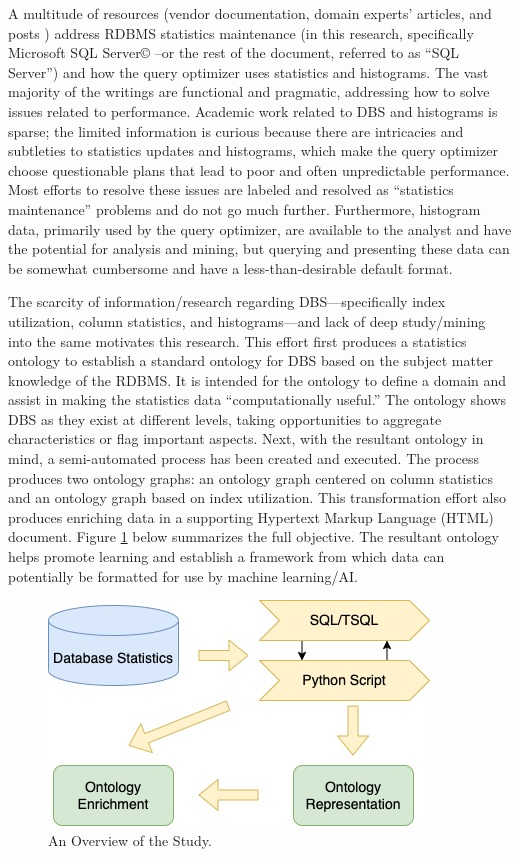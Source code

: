 \documentclass[sigconf]{acmart}
\begin{document}
A multitude of resources (vendor documentation, domain experts' articles, and posts \cite{RWesta, RWestb, RWestc}) address RDBMS statistics maintenance (in this research, specifically Microsoft SQL Server© --or the rest of the document, referred to as “SQL Server”) and how the query optimizer uses statistics and histograms. The vast majority of the writings are functional and pragmatic, addressing how to solve issues related to performance. Academic work related to DBS and histograms is sparse; the limited information is curious because there are intricacies and subtleties to statistics updates and histograms, which make the query optimizer choose questionable plans that lead to poor and often unpredictable performance. Most efforts to resolve these issues are labeled and resolved as “statistics maintenance” problems and do not go much further. Furthermore, histogram data, primarily used by the query optimizer, are available to the analyst and have the potential for analysis and mining, but querying and presenting these data can be somewhat cumbersome and have a less-than-desirable default format.

The scarcity of information/research regarding DBS—specifically index utilization, column statistics, and histograms—and lack of deep study/mining into the same motivates this research. This effort first produces a statistics ontology to establish a standard ontology for DBS based on the subject matter knowledge of the RDBMS. It is intended for the ontology to define a domain and assist in making the statistics data “computationally useful.” The ontology shows DBS as they exist at different levels, taking opportunities to aggregate characteristics or flag important aspects. Next, with the resultant ontology in mind, a semi-automated process has been created and executed. The process produces two ontology graphs: an ontology graph centered on column statistics and an ontology graph based on index utilization. This transformation effort also produces enriching data in a supporting Hypertext Markup Language (HTML) document. Figure \ref{overview} below summarizes the full objective. The resultant ontology helps promote learning and establish a framework from which data can potentially be formatted for use by machine learning/AI.

\begin{figure}[h]
	\centering
	\includegraphics[width=0.8\linewidth]{db-statistics-ontology}
	\caption{An Overview of the Study.}
	\label{overview}
\end{figure}
\end{document}
